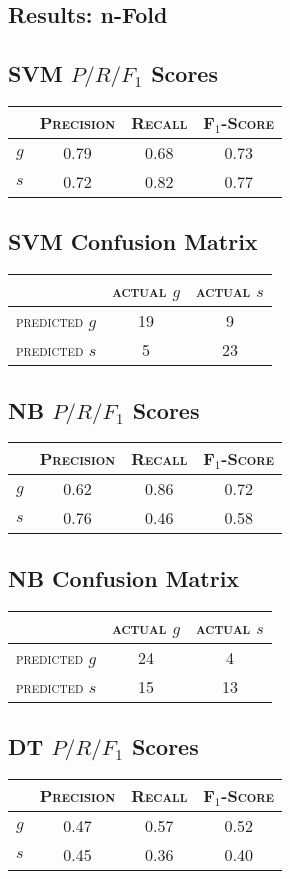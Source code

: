 \begin{multicols}{2}
\section{Results: n-Fold}
\subsection{SVM $P/R/F_1$ Scores}
\begin{tabular}{ c | c  c  c }
	& \textsc{Precision} & \textsc{Recall} & \textsc{F$_1$-Score} \\
	\hline
	\textsc{$g$} 	& 0.79 & 0.68 & 0.73 \\
	\textsc{$s$}	& 0.72 & 0.82 & 0.77
\end{tabular}
\subsection{SVM Confusion Matrix}
\begin{tabular}{ c | c  c }
	 & \textsc{actual $g$} & \textsc{actual $s$} \\
	\hline
	\textsc{predicted $g$} 	& 19 & 9 \\
	\textsc{predicted $s$}		& 5 & 23
\end{tabular}
\subsection{NB $P/R/F_1$ Scores}
\begin{tabular}{ c | c  c  c }
	& \textsc{Precision} & \textsc{Recall} & \textsc{F$_1$-Score} \\
	\hline
	\textsc{$g$} 	& 0.62 & 0.86 & 0.72 \\
	\textsc{$s$}	& 0.76 & 0.46 & 0.58
\end{tabular}
\subsection{NB Confusion Matrix}
\begin{tabular}{ c | c  c }
	 & \textsc{actual $g$} & \textsc{actual $s$} \\
	\hline
	\textsc{predicted $g$} 	& 24 & 4 \\
	\textsc{predicted $s$}		& 15 & 13
\end{tabular}
\subsection{DT $P/R/F_1$ Scores}
\begin{tabular}{ c | c  c  c }
	& \textsc{Precision} & \textsc{Recall} & \textsc{F$_1$-Score} \\
	\hline
	\textsc{$g$} 	& 0.47 & 0.57 & 0.52 \\
	\textsc{$s$}	& 0.45 & 0.36 & 0.40
\end{tabular}

\end{multicols}
